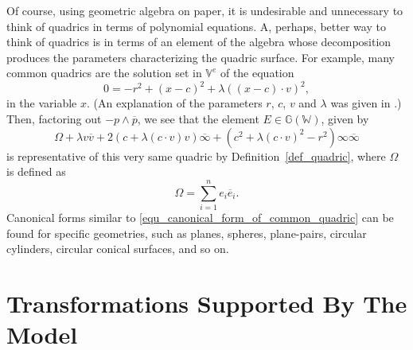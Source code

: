 \documentclass{birkjour}
\theoremstyle{definition}
\theoremstyle{remark}
\numberwithin{equation}{section}
\newcommand{\G}{\mathbb{G}}
\newcommand{\V}{\mathbb{V}}
\newcommand{\W}{\mathbb{W}}
\newcommand{\nvai}{\infty}
\newcommand{\nvaib}{\overline{\infty}}
\begin{document}
Of course, using geometric algebra on paper, it is undesirable and unnecessary to think of
quadrics in terms of polynomial equations.  A, perhaps, better way to think of quadrics is in terms
of an element of the algebra whose decomposition
produces the parameters characterizing the quadric surface.  For example, many common
quadrics are the solution set in $\V^e$ of the equation
\begin{equation}
0 = -r^2 + (x-c)^2 + \lambda((x-c)\cdot v)^2,
\end{equation}
in the variable $x$.  (An explanation of the parameters $r$, $c$, $v$ and $\lambda$
was given in \cite{Parkin12}.)  Then, factoring out $-p\wedge\overline{p}$, we see that
the element $E\in\G(\W)$, given by
\begin{equation}\label{equ_canonical_form_of_common_quadric}
\Omega + \lambda v\overline{v}+2(c+\lambda(c\cdot v)v)\nvaib+
(c^2+\lambda (c\cdot v)^2-r^2)\nvai\nvaib
\end{equation}
is representative of this very same quadric by Definition~\ref{def_quadric},
where $\Omega$ is defined as
\begin{equation}
\Omega = \sum_{i=1}^n e_i\overline{e}_i.
\end{equation}
Canonical forms similar to \eqref{equ_canonical_form_of_common_quadric}
can be found for specific geometries, such as planes, spheres, plane-pairs,
circular cylinders, circular conical surfaces, and so on.

\section{Transformations Supported By The Model}
\end{document}
